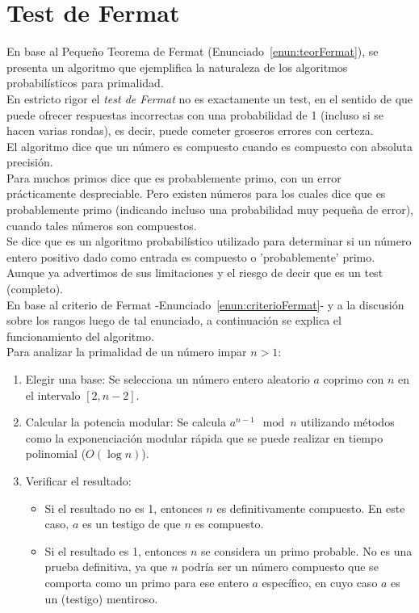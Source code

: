\section{Test de Fermat}
En base al Pequeño Teorema de Fermat (Enunciado~\ref{enun:teorFermat}), se presenta un algoritmo que ejemplifica la naturaleza de los algoritmos probabilísticos para primalidad. \\
En estricto rigor el \textit{test de Fermat} no es exactamente un test, en el sentido de que puede ofrecer respuestas incorrectas con una probabilidad de 1 (incluso si se hacen varias rondas), es decir, puede cometer groseros errores con certeza. \\
El algoritmo dice que un número es compuesto cuando es compuesto con absoluta precisión. \\
Para muchos primos dice que es probablemente primo, con un error prácticamente despreciable.
Pero existen números para los cuales dice que es probablemente primo (indicando incluso una probabilidad muy pequeña de error), cuando tales números son compuestos. \\
Se dice que es un algoritmo probabilístico utilizado para determinar si un número entero positivo dado como entrada es compuesto o 'probablemente' primo. Aunque ya advertimos de sus limitaciones y el riesgo de decir que es un test (completo). \\

En base al criterio de Fermat -Enunciado~\ref{enun:criterioFermat}- y a la discusión sobre los rangos luego de tal enunciado, a continuación se explica el funcionamiento del algoritmo. \\
Para analizar la primalidad de un número impar $n>1$:
\begin{enumerate}
\item Elegir una base: Se selecciona un número entero aleatorio $a$ coprimo con $n$ en el intervalo $[2, n-2]$.
\item Calcular la potencia modular: Se calcula $a^{n-1} \mod n$ utilizando métodos como la exponenciación modular rápida que se puede realizar en tiempo polinomial ($O(\log n)$).
\item Verificar el resultado:
    \begin{itemize}
    \item  Si el resultado no es 1, entonces $n$ es definitivamente compuesto. En este caso, $a$ es un testigo de que $n$ es compuesto.
    \item Si el resultado es 1, entonces $n$ se considera un primo probable. No es una prueba definitiva, ya que $n$ podría ser un número compuesto que se comporta como un primo para ese entero $a$ específico, en cuyo caso $a$ es un (testigo) mentiroso.
    \end{itemize}
\end{enumerate}


